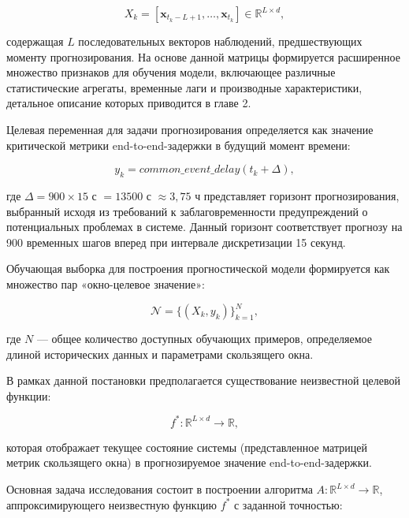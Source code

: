 \begin{equation}
	X_k = [\mathbf{x}_{t_k - L + 1}, \ldots, \mathbf{x}_{t_k}] \in \mathbb{R}^{L \times d},
\end{equation}

содержащая $L$ последовательных векторов наблюдений, предшествующих моменту прогнозирования. На основе данной матрицы формируется расширенное множество признаков для обучения модели, включающее различные статистические агрегаты, временные лаги и производные характеристики, детальное описание которых приводится в главе 2.

\hspace*{1.25cm}Целевая переменная для задачи прогнозирования определяется как значение критической метрики end-to-end-задержки в будущий момент времени:

\begin{equation}
	y_k = common\_event\_delay(t_k + \Delta),
\end{equation}

где $\Delta = 900 \times 15$ с $= 13500$ с $\approx 3{,}75$ ч представляет горизонт прогнозирования, выбранный исходя из требований к заблаговременности предупреждений о потенциальных проблемах в системе. Данный горизонт соответствует прогнозу на 900 временных шагов вперед при интервале дискретизации 15 секунд.

\hspace*{1.25cm}Обучающая выборка для построения прогностической модели формируется как множество пар «окно-целевое значение»:

\begin{equation}
	\mathcal{N} = \{(X_k, y_k)\}_{k=1}^{N},
\end{equation}

где $N$ --- общее количество доступных обучающих примеров, определяемое длиной исторических данных и параметрами скользящего окна.

\hspace*{1.25cm}В рамках данной постановки предполагается существование неизвестной целевой функции:

\begin{equation}
	f^*: \mathbb{R}^{L \times d} \to \mathbb{R},
\end{equation}

которая отображает текущее состояние системы (представленное матрицей метрик скользящего окна) в прогнозируемое значение end-to-end-задержки. 

\hspace*{1.25cm}Основная задача исследования состоит в построении алгоритма $A: \mathbb{R}^{L \times d} \to \mathbb{R}$, аппроксимирующего неизвестную функцию $f^*$ с заданной точностью:

